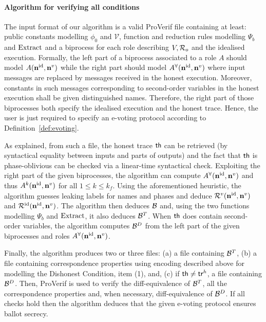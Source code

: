 \paragraph{\textbf{Algorithm for verifying all conditions}}
The input format of our algorithm is a valid ProVerif file containing at least:
public constants modelling $\phi_0$ and $\mathcal{V}$,
function and reduction rules modelling $\Psi_b$ and $\mathrm{Extract}$
and a biprocess for each role describing $V,\mathcal{R}_o$ and the idealised execution.
Formally, the left part of a biprocess associated to a role $A$ %
should model $A({\mathbf{n^{\mathrm{id}}}},{\mathbf{n}}^v)$ while the right part should model
$A^{\forall}({\mathbf{n^{\mathrm{id}}}},{\mathbf{n}}^v)$ where input messages are replaced by messages received in
the honest execution.
Moreover, constants in such messages corresponding to second-order
variables in the honest execution shall be given distinguished names. Therefore, the right part
of those biprocesses both specify the idealised execution and the honest trace.
Hence, the user is just required to specify an e-voting protocol according to Definition~\ref{def:evoting}.


As explained, from such a file, the honest trace $\mathsf{th}$ can be retrieved (by syntactical equality between inputs and parts of outputs)
and the fact that $\mathsf{th}$ is phase-oblivious can be checked via a linear-time syntactical check.
Exploiting the right part of the given biprocesses, the algorithm can compute $A^{\forall}({\mathbf{n^{\mathrm{id}}}},{\mathbf{n}}^v)$
and thus $A^{k}({\mathbf{n^{\mathrm{id}}}},{\mathbf{n}}^v)$ for all $1 \le k\le k_f$.
Using the aforementioned heuristic, the algorithm guesses leaking labels for names and phases
and deduce $\mathcal{R}^v({\mathbf{n^{\mathrm{id}}}},{\mathbf{n}}^v)$ and 
$\mathcal{R}^{\mathrm{id}}({\mathbf{n^{\mathrm{id}}}},{\mathbf{n}}^v)$.
The algorithm then deduces $\mathcal{B}$ and, using the two functions modelling $\Psi_b$ and $\mathrm{Extract}$,
it also deduces $\mathcal{B}^T$.
When $\mathsf{th}$ does contain second-order variables, the algorithm computes $\mathcal{B}^D$ from
the left part of the given biprocesses and roles $A^{\forall}({\mathbf{n^{\mathrm{id}}}},{\mathbf{n}}^v)$.

Finally, the algorithm produces two or three files:
(a) a file containing $\mathcal{B}^T$, (b)
a file containing correspondence properties using encoding described
above for modelling the Dishonest Condition, item (1),
and, (c) if $\mathsf{th}\neq\mathsf{tr}^h$,
a file containing $\mathcal{B}^D$.
Then, ProVerif is used to verify the diff-equivalence
of $\mathcal{B}^T$, all the correspondence properties and, when necessary, diff-equivalence of $\mathcal{B}^D$.
If all checks hold then the algorithm deduces that the given e-voting protocol ensures ballot secrecy.

